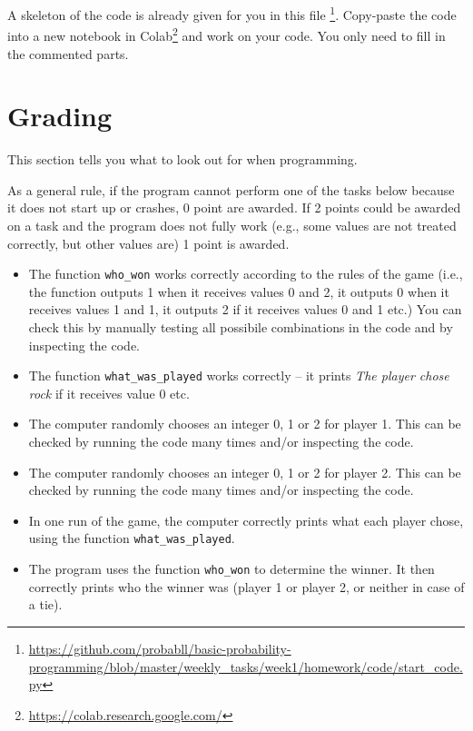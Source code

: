 \documentclass[11pt, a4paper]{article}
\newcommand{\link}[1]{\footnote{\color{blue}\href{#1}{#1}}}
\begin{document}
A skeleton of the code is already given for you in this file \footnote{\href{https://github.com/probabll/basic-probability-programming/blob/master/weekly\_tasks/week1/homework/code/start\_code.py}{https://github.com/probabll/basic-probability-programming/blob/master/weekly\_tasks/week1/homework/code/start\_code.py}}. Copy-paste the code into a new notebook in Colab\link{https://colab.research.google.com/} and work on your code. You only need to fill in the commented parts.


\section{Grading}
This section tells you what to look out for when programming. 

As a general rule, if the program cannot perform one of the tasks below because it does not start up or crashes, 0 point are awarded. If 2 points could be awarded on a task and the program does not fully work (e.g., some values are not treated correctly, but other values are) 1 point is awarded.

\enlargethispage{1cm}

\begin{itemize}
    \item[2 points]	The function \texttt{who\_won} works correctly according to the rules of the game (i.e., the function outputs 1 when it receives values 0 and 2, it outputs 0 when it receives values 1 and 1, it outputs 2 if it receives values 0 and 1 etc.) You can check this by manually testing all possibile combinations in the code and by inspecting the code.
    \item[2 points] The function \texttt{what\_was\_played} works correctly -- it prints \textit{The player chose rock} if it receives value 0 etc.
\item[1 point] The computer randomly chooses an integer 0, 1 or 2 for player 1. This can be checked by running the code many times and/or inspecting the code.
\item[1 point] The computer randomly chooses an integer 0, 1 or 2 for player 2. This can be checked by running the code many times and/or inspecting the code.
\item[2 points] In one run of the game, the computer correctly prints what each player chose, using the function \texttt{what\_was\_played}.
\item[2 points] The program uses the function \texttt{who\_won} to determine the winner. It then correctly prints who the winner was (player 1 or player 2, or neither in case of a tie).
\end{itemize}
\end{document}
